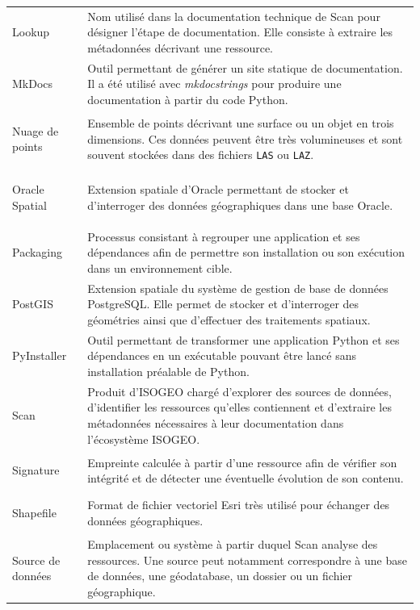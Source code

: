 \begin{longtable}{
    @{}
    >{\bfseries\raggedright\arraybackslash}p{}
    >{\raggedright\arraybackslash}p{}
    @{}
}
Lookup
&
Nom utilisé dans la documentation technique de Scan pour désigner l'étape de
documentation. Elle consiste à extraire les métadonnées décrivant une ressource.
\\

MkDocs
&
Outil permettant de générer un site statique de documentation. Il a été utilisé
avec \textit{mkdocstrings} pour produire une documentation à partir du code
Python.
\\

Nuage de points
&
Ensemble de points décrivant une surface ou un objet en trois dimensions. Ces
données peuvent être très volumineuses et sont souvent stockées dans des
fichiers \texttt{LAS} ou \texttt{LAZ}.
\\

Oracle Spatial
&
Extension spatiale d'Oracle permettant de stocker et d'interroger des données
géographiques dans une base Oracle.
\\

Packaging
&
Processus consistant à regrouper une application et ses dépendances afin de
permettre son installation ou son exécution dans un environnement cible.
\\

PostGIS
&
Extension spatiale du système de gestion de base de données PostgreSQL. Elle
permet de stocker et d'interroger des géométries ainsi que d'effectuer des
traitements spatiaux.
\\

PyInstaller
&
Outil permettant de transformer une application Python et ses dépendances en
un exécutable pouvant être lancé sans installation préalable de Python.
\\

Scan
&
Produit d'ISOGEO chargé d'explorer des sources de données, d'identifier les
ressources qu'elles contiennent et d'extraire les métadonnées nécessaires à leur
documentation dans l'écosystème ISOGEO.
\\

Signature
&
Empreinte calculée à partir d'une ressource afin de vérifier son intégrité et de
détecter une éventuelle évolution de son contenu.
\\

Shapefile
&
Format de fichier vectoriel Esri très utilisé pour échanger des données
géographiques.
\\

Source de données
&
Emplacement ou système à partir duquel Scan analyse des ressources. Une source
peut notamment correspondre à une base de données, une géodatabase, un dossier
ou un fichier géographique.
\\


\end{longtable}
